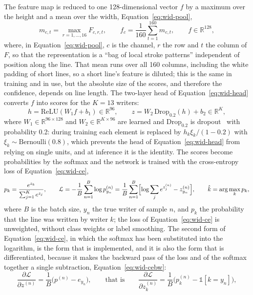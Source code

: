 The feature map is reduced to one 128-dimensional vector $f$ by a maximum over the height and a mean over the width, Equation~\ref{eq:wid-pool},
\begin{equation}
m_{c,t}=\max_{r=1,\ldots,16}F_{c,r,t},\qquad f_c=\frac1{160}\sum_{t=1}^{160}m_{c,t},\qquad f\in\mathbb R^{128},
\label{eq:wid-pool}
\end{equation}
where, in Equation~\ref{eq:wid-pool}, $c$ is the channel, $r$ the row and $t$ the column of $F$, so that the representation is a ``bag of local stroke patterns'' independent of position along the line.
That mean runs over all 160 columns, including the white padding of short lines, so a short line's feature is diluted; this is the same in training and in use, but the absolute size of the scores, and therefore the confidence, depends on line length.
The two-layer head of Equation~\ref{eq:wid-head} converts $f$ into scores for the $K=13$ writers:
\begin{equation}
h=\mathrm{ReLU}(W_1f+b_1)\in\mathbb R^{96},\qquad z=W_2\,\mathrm{Drop}_{0.2}(h)+b_2\in\mathbb R^{K},
\label{eq:wid-head}
\end{equation}
where $W_1\in\mathbb R^{96\times128}$ and $W_2\in\mathbb R^{K\times96}$ are learned and $\mathrm{Drop}_{0.2}$ is dropout~\cite{srivastava2014} with probability 0.2: during training each element is replaced by $h_k\xi_k/(1-0.2)$ with $\xi_k\sim\mathrm{Bernoulli}(0.8)$, which prevents the head of Equation~\ref{eq:wid-head} from relying on single units, and at inference it is the identity.
The scores become probabilities by the softmax and the network is trained with the cross-entropy loss of Equation~\ref{eq:wid-ce},
\begin{equation}
p_k=\frac{e^{z_k}}{\sum_{j=1}^{K}e^{z_j}},\qquad
\mathcal L=-\frac1B\sum_{n=1}^{B}\log p^{(n)}_{y_n}=\frac1B\sum_{n=1}^B\Bigl[\log\sum_je^{z^{(n)}_j}-z^{(n)}_{y_n}\Bigr],\qquad\hat k=\arg\max_kp_k,
\label{eq:wid-ce}
\end{equation}
where $B$ is the batch size, $y_n$ the true writer of sample $n$, and $p_k$ the probability that the line was written by writer $k$; the loss of Equation~\ref{eq:wid-ce} is unweighted, without class weights or label smoothing.
The second form of Equation~\ref{eq:wid-ce}, in which the softmax has been substituted into the logarithm, is the form that is implemented, and it is also the form that is differentiated, because it makes the backward pass of the loss and of the softmax together a single subtraction, Equation~\ref{eq:wid-cebw}:
\begin{equation}
\frac{\partial\mathcal L}{\partial z^{(n)}}=\frac{1}{B}\bigl(p^{(n)}-e_{y_n}\bigr),\qquad\text{that is}\qquad
\frac{\partial\mathcal L}{\partial z^{(n)}_k}=\frac{1}{B}\bigl(p^{(n)}_k-\mathbb 1[k=y_n]\bigr),
\label{eq:wid-cebw}
\end{equation}
